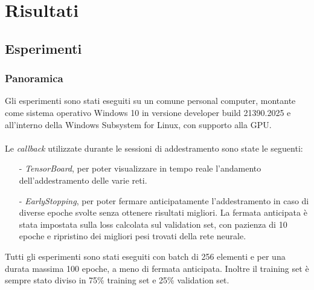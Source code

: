 \chapter{Risultati}
\section{Esperimenti}
\subsection{Panoramica} 
Gli esperimenti sono stati eseguiti su un comune personal computer, montante come sistema operativo Windows 10 in versione developer build 21390.2025 e all'interno della Windows Subsystem for Linux, con supporto alla GPU.\\\\%
Le \textit{callback} utilizzate durante le sessioni di addestramento sono state le seguenti:
\begin{itemize}
    \item[-] \textit{TensorBoard}, per poter visualizzare in tempo reale l'andamento dell'addestramento delle varie reti.
    
    \item[-] \textit{EarlyStopping}, per poter fermare anticipatamente l'addestramento in caso di diverse epoche svolte senza ottenere risultati migliori. La fermata anticipata è stata impostata sulla loss calcolata sul validation set, con pazienza di 10 epoche e ripristino dei migliori pesi trovati della rete neurale.
    
\end{itemize}
Tutti gli esperimenti sono stati eseguiti con batch di 256 elementi e per una durata massima 100 epoche, a meno di fermata anticipata. Inoltre il training set è sempre stato diviso in 75\% training set e 25\% validation set.

